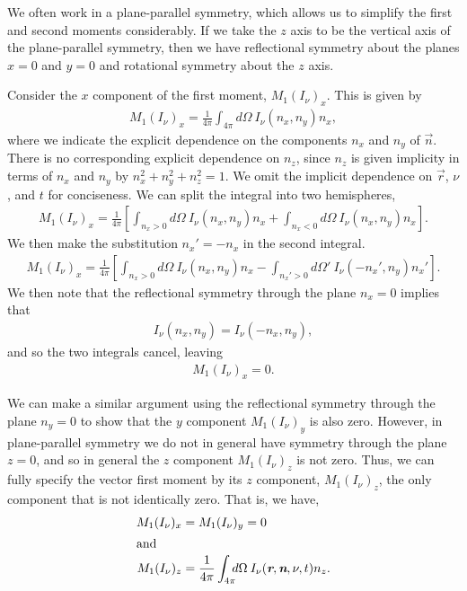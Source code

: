 \newslide

We often work in a plane-parallel symmetry, which allows us to simplify the first and second moments considerably. If
we take the $z$ axis to be the vertical axis of the plane-parallel
symmetry, then we have
reflectional symmetry about the planes $x = 0$ and $y = 0$ and
rotational symmetry about the $z$ axis. 

Consider the $x$ component of the first moment, $M_1(I_\nu)_x$. This is given by
\begin{align}
M_1(I_\nu)_x = \frac{1}{4\pi}\int_{4\pi}\!\!\!d\Omega\:
I_\nu(n_x, n_y) n_x,
\end{align}
where we indicate the explicit dependence on the components $n_x$ and $n_y$ of $\vec n$. There is no corresponding explicit dependence on $n_z$, since $n_z$ is given implicity in terms of $n_x$ and $n_y$ by $n_x^2+n_y^2+n_z^2=1$. We omit the implicit dependence on $\vec r$, $\nu$, and $t$ for conciseness. We can split the integral into two hemispheres,
\begin{align}
M_1(I_\nu)_x =
\frac{1}{4\pi}\left[
\int_{n_x > 0}\!\!\!\!\!\!\!\!\!d\Omega\: I_\nu(n_x, n_y) n_x
+
\int_{n_x < 0}\!\!\!\!\!\!\!\!\!d\Omega\: I_\nu(n_x, n_y) n_x
\right].
\end{align}
We then make the substitution $n_x'=-n_x$ in the second integral.
\begin{align}
M_1(I_\nu)_x = \frac{1}{4\pi}\left[
\int_{n_x > 0}\!\!\!\!\!\!\!\!\!d\Omega\: I_\nu(n_x, n_y) n_x
-
\int_{n_x' > 0}\!\!\!\!\!\!\!\!\!d\Omega'\: I_\nu(-n_x', n_y) n_x'
\right].
\end{align}
We then note that the reflectional symmetry through the plane $n_x = 0$ implies that
\begin{align}
I_\nu(n_x, n_y) = I_\nu(-n_x, n_y),
\end{align}
and so the two integrals cancel, leaving
\begin{align}
M_1(I_\nu)_x = 0.
\end{align}

\newslide

We can make a similar argument using the reflectional symmetry through the plane $n_y = 0$ to show that the $y$ component $M_1(I_\nu)_y$ is also zero. However, in plane-parallel symmetry we do not in general have symmetry through the plane $z = 0$, and so in general the $z$ component $M_1(I_\nu)_z$ is not zero. Thus, we can fully specify the vector first moment by its $z$
component, $M_1(I_\nu)_z$, the only component that is not identically
zero. That is, we have,
\begin{align}
M_1(I_\nu)_x &= 
M_1(I_\nu)_y = 0\\
\intertext{and}
M_1(I_\nu)_z &= \frac{1}{4\pi} \int_{4\pi}\!\!\!d\Omega\:
I_\nu(\vec r, \vec n, \nu, t) n_z.
\end{align}

